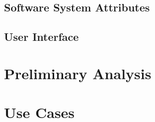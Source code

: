 \documentclass{article}
\begin{document}
	\subsection{Software System Attributes} %
	\subsection{User Interface} %

\section{Preliminary Analysis} %

\section{Use Cases} %



    
  
\end{document}
